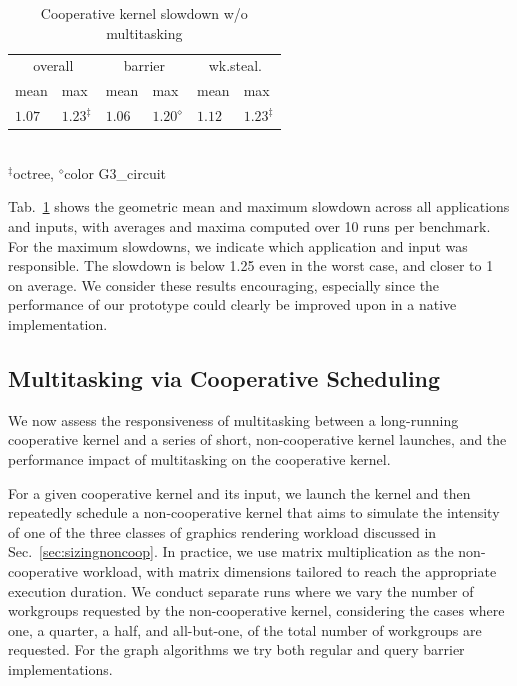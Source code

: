 \documentclass[sigconf]{acmart}
\newcommand{\mytab}{Tab.~}
\newcommand{\mysec}{Sec.~}
\begin{document}
{\begin{table}
\normalsize
\caption{Cooperative kernel slowdown w/o multitasking}
\centering
\begin{tabular}{ l l | l l | l l }
\multicolumn{2}{c|}{overall} & \multicolumn{2}{c|}{barrier} & \multicolumn{2}{c}{wk.steal.} \\
mean & max & mean & max & mean & max \\
\hline
$1.07$ & $1.23^{\ddagger}$ & $1.06$ & $1.20^{\diamond}$ & $1.12$ & $1.23^{\ddagger}$ \\
\end{tabular}\\
{\small
 $^{\ddagger}$octree, $^{\diamond}$color G3\_circuit
}
\label{tab:overhead}
\end{table}



\mytab\ref{tab:overhead} shows the geometric mean and
maximum slowdown across all applications and inputs, with averages and
maxima computed over 10 runs per benchmark. For the maximum slowdowns,
we indicate which application and input was responsible. The slowdown is
below 1.25 even in the worst case, and closer to 1 on average. We consider
these results encouraging, especially since the performance of our
prototype could clearly be improved upon in a native implementation.


\subsection{Multitasking via Cooperative Scheduling}\label{sec:responsiveness}

We now assess the responsiveness of multitasking between a
long-running cooperative kernel and a series of short, non-cooperative
kernel launches, and the performance impact of multitasking on the
cooperative kernel.


 For a given cooperative kernel and
its input, we launch the kernel and then repeatedly schedule a
non-cooperative kernel that aims to simulate the intensity of one of
the three classes of graphics rendering workload discussed in
\mysec\ref{sec:sizingnoncoop}. In practice, we use matrix
multiplication as the non-cooperative workload, with matrix
dimensions tailored to reach the appropriate execution duration.  We
conduct separate runs where we vary the number of workgroups requested
by the non-cooperative kernel, considering the cases where one, a
quarter, a half, and all-but-one, of the total number of workgroups
are requested. For the graph algorithms we try both
regular and query barrier implementations.

}
\end{document}
